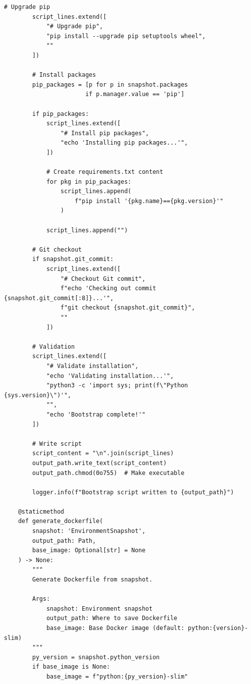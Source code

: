 \begin{lstlisting}[style=python, caption={Environment bootstrap script generator}]
        # Upgrade pip
        script_lines.extend([
            "# Upgrade pip",
            "pip install --upgrade pip setuptools wheel",
            ""
        ])

        # Install packages
        pip_packages = [p for p in snapshot.packages
                       if p.manager.value == 'pip']

        if pip_packages:
            script_lines.extend([
                "# Install pip packages",
                "echo 'Installing pip packages...'",
            ])

            # Create requirements.txt content
            for pkg in pip_packages:
                script_lines.append(
                    f"pip install '{pkg.name}=={pkg.version}'"
                )

            script_lines.append("")

        # Git checkout
        if snapshot.git_commit:
            script_lines.extend([
                "# Checkout Git commit",
                f"echo 'Checking out commit {snapshot.git_commit[:8]}...'",
                f"git checkout {snapshot.git_commit}",
                ""
            ])

        # Validation
        script_lines.extend([
            "# Validate installation",
            "echo 'Validating installation...'",
            "python3 -c 'import sys; print(f\"Python {sys.version}\")'",
            "",
            "echo 'Bootstrap complete!'"
        ])

        # Write script
        script_content = "\n".join(script_lines)
        output_path.write_text(script_content)
        output_path.chmod(0o755)  # Make executable

        logger.info(f"Bootstrap script written to {output_path}")

    @staticmethod
    def generate_dockerfile(
        snapshot: 'EnvironmentSnapshot',
        output_path: Path,
        base_image: Optional[str] = None
    ) -> None:
        """
        Generate Dockerfile from snapshot.

        Args:
            snapshot: Environment snapshot
            output_path: Where to save Dockerfile
            base_image: Base Docker image (default: python:{version}-slim)
        """
        py_version = snapshot.python_version
        if base_image is None:
            base_image = f"python:{py_version}-slim"


\end{lstlisting}
